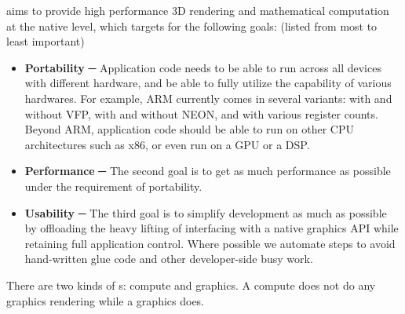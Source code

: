 \RS{} aims to provide high performance 3D rendering and mathematical computation at the native level, which targets for the following goals: (listed from most to least important) \cite{renderscript-part2}
\begin{itemize}
	\item \textbf{Portability} ─{} Application code needs to be able to run across all devices with different hardware, and be able to fully utilize the capability of various hardwares. For example, ARM currently comes in several variants: with and without VFP, with and without NEON, and with various register counts. Beyond ARM, application code should be able to run on other CPU architectures such as x86, or even run on a GPU or a DSP.
	\item \textbf{Performance} ─{} The second goal is to get as much performance as possible under the requirement of portability. 	
    \item \textbf{Usability} ─{} The third goal is to simplify development as much as possible by offloading the heavy lifting of interfacing with a native graphics API while retaining full application control. Where possible we automate steps to avoid hand-written glue code and other developer-side busy work.
\end{itemize}


There are two kinds of \RS{}s: compute and graphics. A compute \RS{} does not do any graphics rendering while a graphics \RS{} does.

